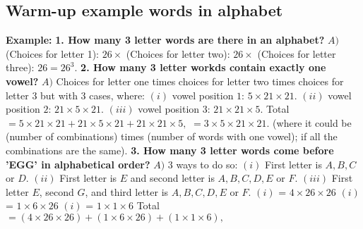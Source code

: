 \documentclass{article}
\begin{document}
\subsection{Warm-up example words in alphabet}
\textbf{Example: }
\newline 
\textbf{1. How many 3 letter words are there in an alphabet?}
\newline
\newline
$A) $ (Choices for letter 1): $26 \times $ (Choices for letter two): $26 \times$ (Choices for letter three): $26  = 26^3.$
\newline
\newline
\textbf{2. How many 3 letter workds contain exactly one vowel?}
\newline
\newline
$A) $ Choices for letter one times choices for letter two times choices for letter $3$ but with $3$ cases, where: 
\newline
$(i) $ vowel position $1$: $5 \times 21 \times 21.$
\newline
$(ii) $ vowel position $2$: $21 \times 5 \times 21.$
\newline
$(iii) $ vowel position $3$: $21 \times 21 \times 5.$
\newline
Total $ = 5 \times 21 \times 21  + 21 \times 5 \times 21 + 21 \times 21 \times 5,$
\newline
$ = 3 \times 5 \times 21 \times 21.$ (where it could be (number of combinations) times (number of words with one vowel); if all the combinations are the same).
\newline
\newline
\textbf{3. How many 3 letter words come before 'EGG' in alphabetical order?}
\newline
\newline
$A) $ 3 ways to do so:
\newline
\newline
$(i) $ First letter is $A, B, C$ or $D$.
\newline
$(ii) $ First letter is $E$ and second letter is $A, B, C, D, E$ or $F$.
\newline
$(iii) $ First letter $E$, second $G$, and third letter is $A, B, C, D, E$ or $F$.
\newline
\newline
$(i)$ = $4 \times 26 \times 26$
\newline
$(i)$ = $1 \times 6 \times 26$
\newline
$(i)$ = $1 \times 1 \times 6$
\newline
Total $ = (4 \times  26 \times 26) + (1 \times 6 \times 26) + (1 \times 1 \times 6),$
\newpage
\end{document}

